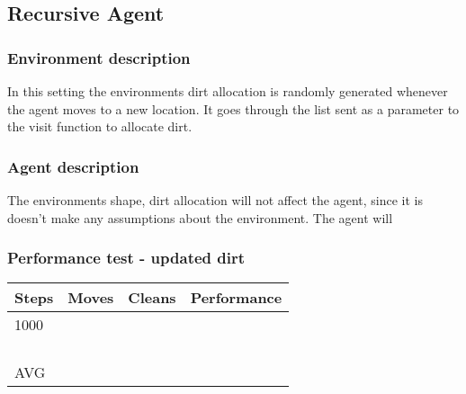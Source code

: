 \subsection{Recursive Agent}
\subsubsection{Environment description}
In this setting the environments dirt allocation is randomly generated whenever
the agent moves to a new location.  It goes through the list sent as a parameter
to the visit function to allocate dirt.


\subsubsection{Agent description}
The environments shape, dirt allocation will not affect the agent, since it is
doesn't make any assumptions about the environment. The agent will 

\subsubsection{Performance test - updated dirt}
\begin{longtable}{ p{} p{} p{} 
									 p{} }
Steps & Moves & Cleans	& Performance \\\hline
1000	&  &  &  \\
 		 	&  &  &  \\
 			&  &  &  \\
 			&  &  &  \\
 			&  &  &  \\\hline
AVG		&  &  &	 \\\hline
\end{longtable}
